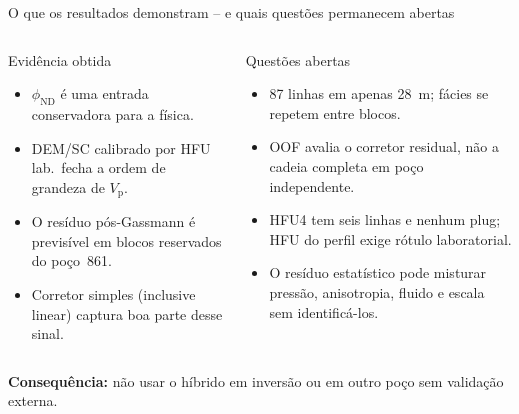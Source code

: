 \documentclass[aspectratio=169,10pt]{beamer}
\newcommand{\phiND}{\ensuremath{\phi_{\mathrm{ND}}}}
\newcommand{\Vp}{\ensuremath{V_{\mathrm{p}}}}
\begin{document}
\begin{frame}{O que os resultados demonstram -- e quais quest\~oes permanecem abertas}
  \begin{columns}[T,onlytextwidth]
    \begin{block}{Evid\^encia obtida}
      \scriptsize
      \begin{itemize}
        \item \phiND{} \'e uma entrada conservadora para a f\'isica.
        \item DEM/SC calibrado por HFU lab.\ fecha a ordem de grandeza
              de \Vp{}.
        \item O res\'iduo p\'os-Gassmann \'e previs\'ivel em blocos
              reservados do po\c{c}o~861.
        \item Corretor simples (inclusive linear) captura boa parte
              desse sinal.
      \end{itemize}
    \end{block}
    \begin{exampleblock}{Quest\~oes abertas}
      \scriptsize
      \begin{itemize}
        \item 87 linhas em apenas 28~m; f\'acies se repetem entre blocos.
        \item OOF avalia o corretor residual, n\~ao a cadeia completa
              em po\c{c}o independente.
        \item HFU4 tem seis linhas e nenhum plug; HFU do perfil exige
              r\'otulo laboratorial.
        \item O res\'iduo estat\'istico pode misturar press\~ao,
              anisotropia, fluido e escala sem identific\'a-los.
      \end{itemize}
    \end{exampleblock}
  \end{columns}
  \vspace{0.10cm}
  \centering
  \textbf{Consequ\^encia:} n\~ao usar o h\'ibrido em invers\~ao ou em outro
  po\c{c}o sem valida\c{c}\~ao externa.
\end{frame}
\end{document}
